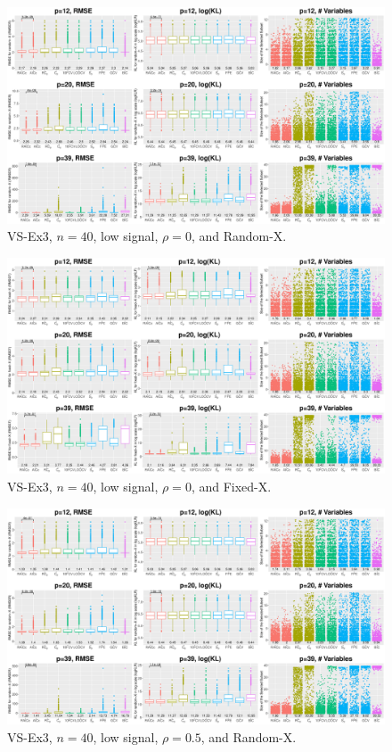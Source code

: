 \clearpage
\begin{figure}[!ht]
\centering
\includegraphics[width=\textwidth]{figures/supplement/randomx_VS-Ex3_n40_lsnr_rho0.eps}
\caption{VS-Ex3, $n=40$, low signal, $\rho=0$, and Random-X.}
\end{figure}
\begin{figure}[!ht]
\centering
\includegraphics[width=\textwidth]{figures/supplement/fixedx_VS-Ex3_n40_lsnr_rho0.eps}
\caption{VS-Ex3, $n=40$, low signal, $\rho=0$, and Fixed-X.}
\end{figure}
\clearpage
\begin{figure}[!ht]
\centering
\includegraphics[width=\textwidth]{figures/supplement/randomx_VS-Ex3_n40_lsnr_rho05.eps}
\caption{VS-Ex3, $n=40$, low signal, $\rho=0.5$, and Random-X.}
\end{figure}

